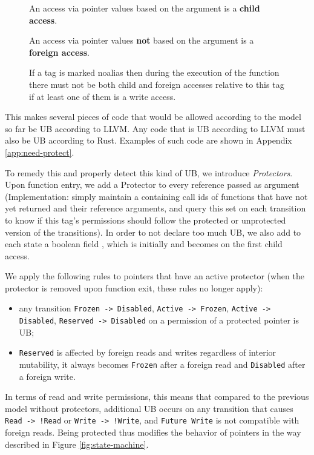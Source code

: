 \documentclass[a4paper,11pt]{article}
\theoremstyle{plain}
\theoremstyle{definition}
\theoremstyle{remark}
\newcommand{\tcode}[1]{\rstinline{#1}}
\newcommand{\tperm}[1]{\texttt{#1}}
\begin{document}
\begin{figure}[h]
    \centering
    \begin{minipage}{0.8\textwidth}
        An access via pointer values based on the argument is a \textbf{child access}.

        An access via pointer values \textbf{not} based on the argument is a \textbf{foreign access}.

        If a tag is marked noalias then during the execution of the function there must
        not be both child and foreign accesses relative to this tag if at least one of them is a write access.
    \end{minipage}
\end{figure}

This makes several pieces of code that would be allowed according to the model so
far be UB according to LLVM. Any code that is UB according to LLVM must also be
UB according to Rust. Examples of such code are shown in Appendix \ref{app:need-protect}.

To remedy this and properly detect this kind of UB, we introduce \textit{Protectors}.
Upon function entry, we add a Protector to every reference passed as argument (Implementation:
simply maintain a \tcode{HashSet} containing call ids of functions that have not yet
returned and their reference arguments, and query this set on each transition
to know if this tag's permissions should follow the protected or unprotected
version of the transitions). In order to not declare too much UB, we also add
to each state a boolean field \tcode{accessed}, which is initially \tcode{false}
and becomes \tcode{true} on the first child access.

We apply the following rules to pointers that have an active protector
(when the protector is removed upon function exit, these rules no longer apply):

\begin{itemize}
    \item any transition \tperm{Frozen -> Disabled}, \tperm{Active -> Frozen},
        \tperm{Active -> Disabled}, \tperm{Reserved -> Disabled} on a permission of a protected
        pointer is UB;
    \item \tperm{Reserved} is affected by foreign reads and writes regardless of interior mutability,
        it always becomes \tperm{Frozen} after a foreign read and \tperm{Disabled} after a foreign write.
\end{itemize}

In terms of read and write permissions, this means that compared to the previous
model without protectors, additional UB occurs on any transition that causes
\tperm{Read -> !Read} or \tperm{Write -> !Write}, and \tperm{Future Write} is not
compatible with foreign reads.
Being protected thus modifies the behavior of pointers in the way described in Figure \ref{fig:state-machine}.
\end{document}
